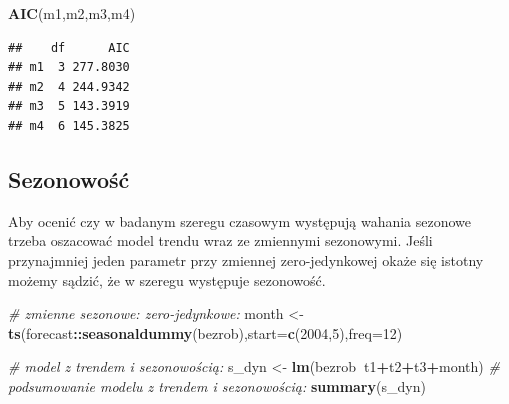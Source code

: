 \documentclass[polish,]{book}
\newenvironment{Shaded}{\begin{snugshade}}{\end{snugshade}}
\newcommand{\CommentTok}[1]{\textcolor[rgb]{0.56,0.35,0.01}{\textit{#1}}}
\newcommand{\DataTypeTok}[1]{\textcolor[rgb]{0.13,0.29,0.53}{#1}}
\newcommand{\DecValTok}[1]{\textcolor[rgb]{0.00,0.00,0.81}{#1}}
\newcommand{\KeywordTok}[1]{\textcolor[rgb]{0.13,0.29,0.53}{\textbf{#1}}}
\newcommand{\NormalTok}[1]{#1}
\newcommand{\OperatorTok}[1]{\textcolor[rgb]{0.81,0.36,0.00}{\textbf{#1}}}
\newcommand{\StringTok}[1]{\textcolor[rgb]{0.31,0.60,0.02}{#1}}
\begin{document}
\begin{Shaded}
\begin{Highlighting}[]
\KeywordTok{AIC}\NormalTok{(m1,m2,m3,m4)}
\end{Highlighting}
\end{Shaded}

\begin{verbatim}
##    df      AIC
## m1  3 277.8030
## m2  4 244.9342
## m3  5 143.3919
## m4  6 145.3825
\end{verbatim}

\hypertarget{part_10.2.2}{%
\subsection{Sezonowość}\label{part_10.2.2}}

Aby ocenić czy w badanym szeregu czasowym występują wahania sezonowe trzeba
oszacować model trendu wraz ze zmiennymi sezonowymi. Jeśli przynajmniej jeden
parametr przy zmiennej zero-jedynkowej okaże się istotny możemy sądzić, że w szeregu występuje sezonowość.

\begin{Shaded}
\begin{Highlighting}[]
\CommentTok{# zmienne sezonowe: zero-jedynkowe:}
\NormalTok{month <-}\StringTok{ }\KeywordTok{ts}\NormalTok{(forecast}\OperatorTok{::}\KeywordTok{seasonaldummy}\NormalTok{(bezrob),}\DataTypeTok{start=}\KeywordTok{c}\NormalTok{(}\DecValTok{2004}\NormalTok{,}\DecValTok{5}\NormalTok{),}\DataTypeTok{freq=}\DecValTok{12}\NormalTok{)}
\end{Highlighting}
\end{Shaded}

\begin{Shaded}
\begin{Highlighting}[]
\CommentTok{# model z trendem i sezonowością:}
\NormalTok{s_dyn <-}\StringTok{ }\KeywordTok{lm}\NormalTok{(bezrob}\OperatorTok{~}\NormalTok{t1}\OperatorTok{+}\NormalTok{t2}\OperatorTok{+}\NormalTok{t3}\OperatorTok{+}\NormalTok{month)}
\CommentTok{# podsumowanie modelu z trendem i sezonowością:}
\KeywordTok{summary}\NormalTok{(s_dyn)}
\end{Highlighting}
\end{Shaded}
\end{document}
